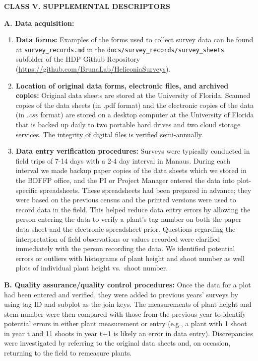 \documentclass[
  man, donotrepeattitle,floatsintext]{apa6}
\begin{document}
\noindent
\textbf{CLASS V. SUPPLEMENTAL DESCRIPTORS}

\noindent  
\textbf{A. Data acquisition:}

\begin{enumerate}
\def\labelenumi{\arabic{enumi}.}
\item
  \textbf{Data forms:} Examples of the forms used to collect survey data can be found at \texttt{survey\_records.md} in the \texttt{docs/survey\_records/survey\_sheets} subfolder of the HDP Github Repository (\url{https://github.com/BrunaLab/HeliconiaSurveys}).
\item
  \textbf{Location of original data forms, electronic files, and archived copies:} Original data sheets are stored at the University of Florida. Scanned copies of the data sheets (in .pdf format) and the electronic copies of the data (in \emph{.csv} format) are stored on a desktop computer at the University of Florida that is backed up daily to two portable hard drives and two cloud storage services. The integrity of digital files is verified semi-annually.
\item
  \textbf{Data entry verification procedures:} Surveys were typically conducted in field trips of 7-14 days with a 2-4 day interval in Manaus. During each interval we made backup paper copies of the data sheets which we stored in the BDFFP office, and the PI or Project Manager entered the data into plot-specific spreadsheets. These spreadsheets had been prepared in advance; they were based on the previous census and the printed versions were used to record data in the field. This helped reduce data entry errors by allowing the person entering the data to verify a plant's tag number on both the paper data sheet and the electronic spreadsheet prior. Questions regarding the interpretation of field observations or values recorded were clarified immediately with the person recording the data. We identified potential errors or outliers with histograms of plant height and shoot number as well plots of individual plant height vs.~shoot number.
\end{enumerate}

\noindent
\textbf{B. Quality assurance/quality control procedures:} Once the data for a plot had been entered and verified, they were added to previous years' surveys by using tag ID and subplot as the join keys. The measurements of plant height and stem number were then compared with those from the previous year to identify potential errors in either plant measurement or entry (e.g., a plant with 1 shoot in year t and 11 shoots in year t+1 is likely an error in data entry). Discrepancies were investigated by referring to the original data sheets and, on occasion, returning to the field to remeasure plants.
\end{document}
